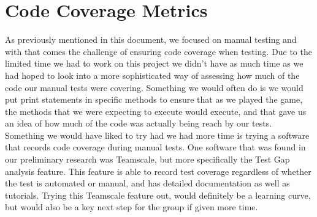 \documentclass[12pt, titlepage]{article}
\begin{document}
\section{Code Coverage Metrics}

As previously mentioned in this document, we focused on manual testing and with that comes the challenge of ensuring code coverage when testing. Due to the limited time we had to work on this project we didn't have as much time as we had hoped to look into a more sophisticated way of assessing how much of the code our manual tests were covering. Something we would often do is we would put print statements in specific methods to ensure that as we played the game, the methods that we were expecting to execute would execute, and that gave us an idea of how much of the code was actually being reach by our tests. Something we would have liked to try had we had more time is trying a software that records code coverage during manual tests. One software that was found in our preliminary research was Teamscale, but more specifically the Test Gap analysis feature. This feature is able to record test coverage regardless of whether the test is automated or manual, and has detailed documentation as well as tutorials. Trying this Teamscale feature out, would definitely be a learning curve, but would also be a key next step for the group if given more time.




\end{document}
